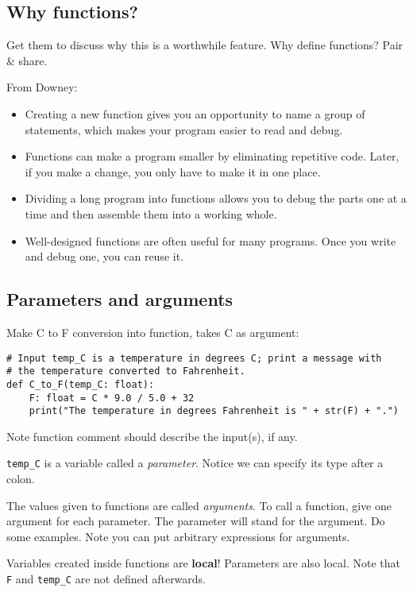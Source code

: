 \documentclass{article}
\begin{document}
\subsection*{Why functions?}

Get them to discuss why this is a worthwhile feature.  Why define
functions?  Pair \& share.

From Downey:

\begin{itemize}
\item Creating a new function gives you an opportunity to name a group
  of statements, which makes your program easier to read and debug.
\item  Functions can make a program smaller by eliminating repetitive code.
  Later, if you make a change, you only have to make it in one place.
\item Dividing a long program into
  functions allows you to debug the parts one at a time and then
  assemble them into a working whole.
\item Well-designed functions are often useful for many programs.
  Once you write and debug one, you can reuse it.
\end{itemize}

\subsection*{Parameters and arguments}

Make C to F conversion into function, takes C as argument:
\begin{verbatim}
# Input temp_C is a temperature in degrees C; print a message with
# the temperature converted to Fahrenheit.
def C_to_F(temp_C: float):
    F: float = C * 9.0 / 5.0 + 32
    print("The temperature in degrees Fahrenheit is " + str(F) + ".")
\end{verbatim}

Note function comment should describe the input(s), if any.

\verb|temp_C| is a variable called a \emph{parameter}.  Notice we can
specify its type after a colon.

The values given to functions are called \emph{arguments}.  To call a
function, give one argument for each parameter.  The parameter will
stand for the argument.  Do some examples.  Note you can put arbitrary
expressions for arguments.

Variables created inside functions are \textbf{local}!  Parameters are also
local. Note that \verb|F| and \verb|temp_C| are not defined afterwards.
\end{document}
